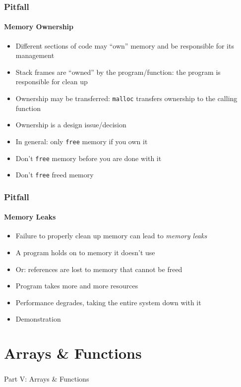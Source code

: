 \documentclass[]{beamer}
\begin{document}
\begin{frame}[fragile]
    \frametitle{Pitfall}
    \framesubtitle{Memory Ownership}

\begin{itemize}[<+->]  
  \item Different sections of code may ``own'' memory and be responsible for its management
  \item Stack frames are ``owned'' by the program/function: the program is responsible for clean up 
  \item Ownership may be transferred: \texttt{malloc} transfers ownership to the calling function
  \item Ownership is a design issue/decision
  \item In general: only \texttt{free} memory if you own it
  \item Don't \texttt{free} memory before you are done with it
  \item Don't \texttt{free} freed memory
\end{itemize}

\end{frame}

\begin{frame}[fragile]
    \frametitle{Pitfall}
    \framesubtitle{Memory Leaks}

\begin{itemize}[<+->]  
  \item Failure to properly clean up memory can lead to \emph{memory leaks}
  \item A program holds on to memory it doesn't use
  \item Or: references are lost to memory that cannot be freed
  \item Program takes more and more resources 
  \item Performance degrades, taking the entire system down with it
  \item Demonstration
\end{itemize}
  
\end{frame}

\section{Arrays \& Functions}

\begin{frame}
    \frametitle{}
    \framesubtitle{}
    
    \begin{center}
    {\Huge Part V: Arrays \& Functions}\\
    {\Large ~}
    \end{center}

\end{frame}
\end{document}
